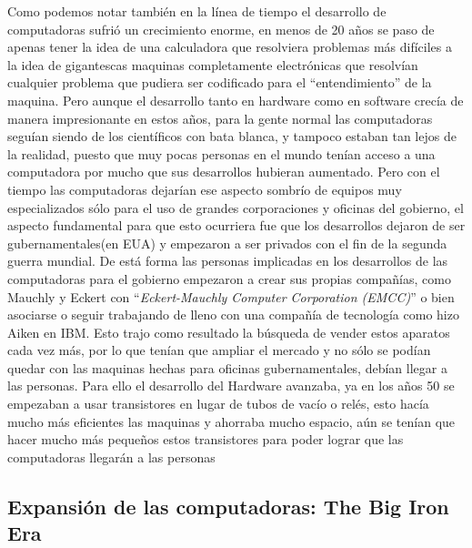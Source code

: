 \documentclass[letterpaper,12pt,oneside]{book}
\begin{document}
		Como podemos notar también en la línea de tiempo el desarrollo de computadoras sufrió un crecimiento enorme, en menos de 20 años se paso de apenas tener la idea
		de una calculadora que resolviera problemas más difíciles a la idea de gigantescas maquinas completamente electrónicas que resolvían cualquier problema
		que pudiera ser codificado para el ``entendimiento'' de la maquina. Pero aunque el desarrollo tanto en hardware como en software crecía de manera impresionante en
		estos años, para la gente normal las computadoras seguían siendo de los científicos con bata blanca, y tampoco estaban tan lejos de la realidad, puesto que
		muy pocas personas en el mundo tenían acceso a una computadora por mucho que sus desarrollos hubieran aumentado. Pero con el tiempo las computadoras
		dejarían ese aspecto sombrío de equipos muy especializados sólo para el uso de grandes corporaciones y oficinas del gobierno, el aspecto fundamental
		para que esto ocurriera fue que los desarrollos dejaron de ser gubernamentales(en EUA) y empezaron a ser privados con el fin de la segunda guerra mundial.
		De está forma las personas implicadas en los desarrollos de las computadoras para el gobierno empezaron a crear sus propias compañías, como Mauchly y Eckert
		con ``\textit{Eckert-Mauchly Computer Corporation (EMCC)}'' o bien asociarse o seguir trabajando de lleno con una compañía de tecnología como
		hizo Aiken en IBM. Esto trajo como resultado la búsqueda de vender estos aparatos cada vez más, por lo que tenían que ampliar el mercado y no sólo
		se podían quedar con las maquinas hechas para oficinas gubernamentales, debían llegar a las personas. Para ello el desarrollo del Hardware avanzaba,
		ya en los años 50 se empezaban a usar transistores en lugar de tubos de vacío o relés, esto hacía mucho más eficientes las maquinas y ahorraba mucho espacio,
		aún se tenían que hacer mucho más pequeños estos transistores para poder lograr que las computadoras llegarán a las personas
		
		
		\subsection{Expansión de las computadoras: The Big Iron Era}
		
		
\end{document}
